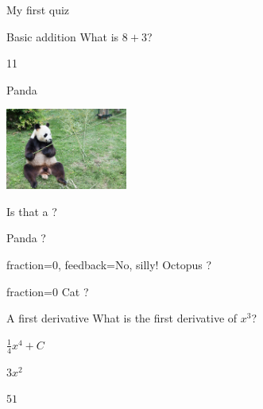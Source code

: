 \documentclass[12pt]{article}
\begin{document}
\begin{quiz}{My first quiz}
\begin{numerical}[points=2]{Basic addition}
What is $8+3$?
\item 11
\end{numerical}

\begin{shortanswer}[case sensitive=true]{Panda}

\includegraphics[width = 4cm]{panda.jpg}

Is that a ?
\item Panda ?
\item[fraction=0, feedback={No, silly!}] Octopus ?
\item{fraction=0} Cat ?
\end{shortanswer}

\begin{multi}[points=3]{A first derivative}
What is the first derivative of $x^3$?
\item  $\frac{1}{4} x^4+C$
\item* $3x^2$
\item  $51$
\end{multi}
\end{quiz}
\end{document}
